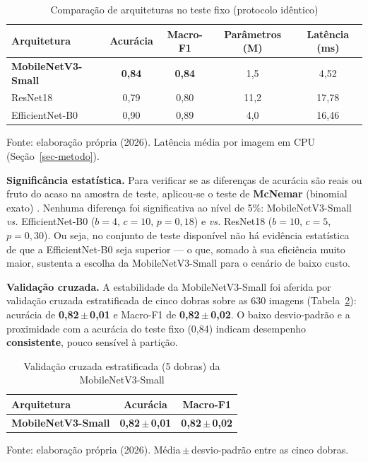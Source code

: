\documentclass[
	article,			%
	11pt,				%
	oneside,			%
	a4paper,			%
	english,			%
	brazilian,			%
	sumario=tradicional
	]{abntex2}
\begin{document}
\begin{table}[htb]
\centering
\caption{Comparação de arquiteturas no teste fixo (protocolo idêntico)}
\label{tab-baselines}
\begin{tabular}{@{}lcccc@{}}
\toprule
\textbf{Arquitetura} & \textbf{Acurácia} & \textbf{Macro-F1} & \textbf{Parâmetros (M)} & \textbf{Latência (ms)}\\
\midrule
\textbf{MobileNetV3-Small} & \textbf{0,84} & \textbf{0,84} & 1,5 & 4,52\\
ResNet18 & 0,79 & 0,80 & 11,2 & 17,78\\
EfficientNet-B0 & 0,90 & 0,89 & 4,0 & 16,46\\
\bottomrule
\end{tabular}

\vspace{2pt}
{\footnotesize Fonte: elaboração própria (2026). Latência média por imagem em CPU
(Seção~\ref{sec-metodo}).}
\end{table}

\noindent\textbf{Significância estatística.} Para verificar se as diferenças de
acurácia são reais ou fruto do acaso na amostra de teste, aplicou-se o teste de
\textbf{McNemar} (binomial exato) \cite{dietterich1998tests}. Nenhuma diferença foi
significativa ao nível de 5\%: MobileNetV3-Small \textit{vs.} EfficientNet-B0
($b{=}4$, $c{=}10$, $p{=}0{,}18$) e \textit{vs.} ResNet18 ($b{=}10$, $c{=}5$,
$p{=}0{,}30$). Ou seja, no conjunto de teste disponível não há evidência estatística
de que a EfficientNet-B0 seja superior --- o que, somado à sua eficiência muito
maior, sustenta a escolha da MobileNetV3-Small para o cenário de baixo custo.

\noindent\textbf{Validação cruzada.} A estabilidade da MobileNetV3-Small foi aferida
por validação cruzada estratificada de cinco dobras sobre as 630 imagens
(Tabela~\ref{tab-kfold}): acurácia de \textbf{0,82\,$\pm$\,0,01} e Macro-F1 de
\textbf{0,82\,$\pm$\,0,02}. O baixo desvio-padrão e a proximidade com a acurácia do
teste fixo (0,84) indicam desempenho \textbf{consistente}, pouco sensível à partição.

\begin{table}[htb]
\centering
\caption{Validação cruzada estratificada (5 dobras) da MobileNetV3-Small}
\label{tab-kfold}
\begin{tabular}{@{}lcc@{}}
\toprule
\textbf{Arquitetura} & \textbf{Acurácia} & \textbf{Macro-F1}\\
\midrule
\textbf{MobileNetV3-Small} & \textbf{0,82\,$\pm$\,0,01} & \textbf{0,82\,$\pm$\,0,02}\\
\bottomrule
\end{tabular}

\vspace{2pt}
{\footnotesize Fonte: elaboração própria (2026). Média\,$\pm$\,desvio-padrão entre as cinco dobras.}
\end{table}
\end{document}
